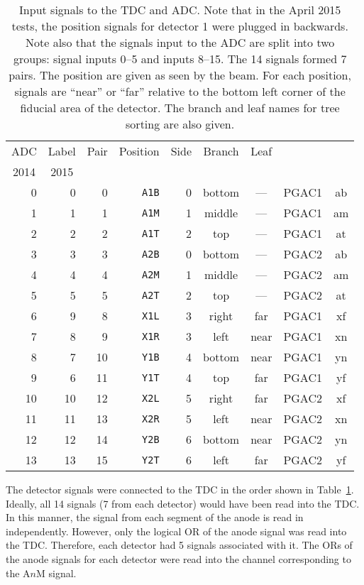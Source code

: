 \begin{table}
\begin{minipage}{\textwidth}
\begin{center}
\begin{tabular}{rrr|rrcc|cc}
\multicolumn{1}{c}{ADC} &\multicolumn{1}{|c}{Label}& \multicolumn{1}{c}{Pair} & Position & Side & Branch & Leaf \\
\cline{1-2} 
\multicolumn{1}{c}{2014} & \multicolumn{1}{c}{2015} & \multicolumn{1}{c}{}\\
\hline \hline
 0 &  0 &  0 &\texttt{A1B} & 0 & bottom & ---&PGAC1&ab\\
 1 &  1 &  1 &\texttt{A1M} & 1 & middle & ---&PGAC1&am\\
 2 &  2 &  2 &\texttt{A1T} & 2 & top & ---&PGAC1&at\\
 3 &  3 &  3 &\texttt{A2B} & 0 & bottom & ---&PGAC2&ab\\
 4 &  4 &  4 &\texttt{A2M} & 1 & middle & ---&PGAC2&am\\
 5 &  5 &  5 &\texttt{A2T} & 2 & top & ---&PGAC2&at\\ \hline 
 6 &  {\color{red}9} &  8 &\texttt{X1L} & 3 & right & far&PGAC1&xf\\
 7 &  {\color{red}8} &  9 &\texttt{X1R} & 3 & left & near&PGAC1&xn\\
 8 &  {\color{red}7} & 10 &\texttt{Y1B} & 4 & bottom & near&PGAC1&yn\\
 9 &  {\color{red}6} & 11 &\texttt{Y1T} & 4 & top & far&PGAC1&yf\\
10 & 10 & 12 &\texttt{X2L} & 5 & right & far&PGAC2&xf\\
11 & 11 & 13 &\texttt{X2R} & 5 & left & near&PGAC2&xn\\
12 & 12 & 14 &\texttt{Y2B} & 6 & bottom & near&PGAC2&yn\\
13 & 13 & 15 &\texttt{Y2T} & 6 & left & far&PGAC2&yf\\
 \hline 
\end{tabular}
\end{center}
\end{minipage}

\caption{Input signals to the TDC and ADC.  Note that in the April 2015 tests, the position signals for detector 1 were plugged in backwards. Note also that the signals input to the ADC are split into two groups: signal inputs 0--5 and inputs 8--15. The 14 signals formed 7 pairs.  The position are given as seen by the beam.  For each position, signals are ``near'' or ``far'' relative to the bottom left corner of the fiducial area of the detector. The branch and leaf names for tree sorting are also given.}
\label{TDC_signals}
%
\end{table}

The detector signals were connected to the TDC in the order shown in Table~\ref{TDC_signals}. Ideally, all 14 signals (7 from each detector) would have been read into the TDC.  In this manner, the signal from each segment of the anode is read in independently.  However, only the logical OR of the anode signal was read into the TDC.  Therefore, each detector had 5 signals associated with it.  The ORs of the anode signals for each detector were read into the channel corresponding to the A$n$M signal.

